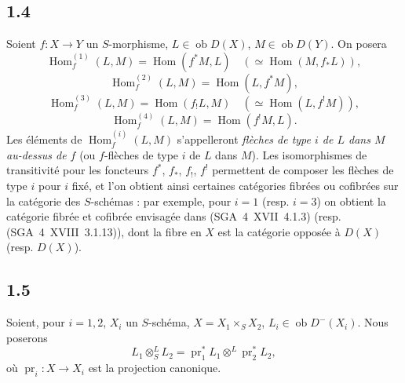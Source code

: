 \documentclass[11pt]{article}
\DeclareMathOperator{\Hom}{Hom}
\newcommand{\ob}{\operatorname{ob}}
\providecommand{\pr}{\operatorname{pr}}
\providecommand{\Hom}{\operatorname{Hom}}
\providecommand{\ob}{\operatorname{ob}}
\providecommand{\pr}{\operatorname{pr}}
\providecommand{\Hom}{\operatorname{Hom}}
\begin{document}
\subsection*{1.4}
Soient $f:X\to Y$ un $S$-morphisme, $L\in\ob D(X)$, $M\in\ob D(Y)$. On posera
\[
\Hom_f^{(1)}(L,M)=\Hom(f^{*}M,L)\quad (\simeq \Hom(M,f_{*}L)),
\]
\[
\Hom_f^{(2)}(L,M)=\Hom(L,f^{*}M),
\]
\[
\Hom_f^{(3)}(L,M)=\Hom(f_{!}L,M)\quad (\simeq \Hom(L,f^{!}M)),
\]
\[
\Hom_f^{(4)}(L,M)=\Hom(f^{!}M,L).
\]
Les éléments de $\Hom_f^{(i)}(L,M)$ s'appelleront \emph{flèches de type $i$ de $L$ dans $M$ au-dessus de $f$} (ou $f$-flèches de type $i$ de $L$ dans $M$). Les isomorphismes de transitivité pour les foncteurs $f^{*}$, $f_{*}$, $f_{!}$, $f^{!}$ permettent de composer les flèches de type $i$ pour $i$ fixé, et l'on obtient ainsi certaines catégories fibrées ou cofibrées sur la catégorie des $S$-schémas : par exemple, pour $i=1$ (resp. $i=3$) on obtient la catégorie fibrée et cofibrée envisagée dans (SGA~4~XVII~4.1.3) (resp. (SGA~4~XVIII~3.1.13)), dont la fibre en $X$ est la catégorie opposée à $D(X)$ (resp. $D(X)$).

\subsection*{1.5}
Soient, pour $i=1,2$, $X_i$ un $S$-schéma, $X=X_1\times_S X_2$, $L_i\in\ob D^{-}(X_i)$. Nous poserons
\[
L_1\otimes^{L}_{S}L_2=\pr_1^{*}L_1\otimes^{L}\pr_2^{*}L_2,
\]
où $\pr_i:X\to X_i$ est la projection canonique.
\end{document}
